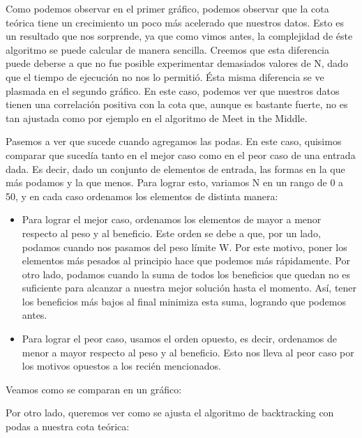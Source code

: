 Como podemos observar en el primer gráfico, podemos observar que la cota teórica tiene un crecimiento un poco más acelerado que nuestros datos. Esto es un resultado que nos sorprende, ya que como vimos antes, la complejidad de éste algoritmo se puede calcular de manera sencilla. Creemos que esta diferencia puede deberse a que no fue posible experimentar demasiados valores de N, dado que el tiempo de ejecución no nos lo permitió.
\newline
Ésta misma diferencia se ve plasmada en el segundo gráfico. En este caso, podemos ver que nuestros datos tienen una correlación positiva con la cota que, aunque es bastante fuerte, no es tan ajustada como por ejemplo en el algoritmo de Meet in the Middle.

\bigskip

Pasemos a ver que sucede cuando agregamos las podas. En este caso, quisimos comparar que sucedía tanto en el mejor caso como en el peor caso de una entrada dada. Es decir, dado un conjunto de elementos de entrada, las formas en la que más podamos y la que menos. Para lograr esto, variamos N en un rango de 0 a 50, y en cada caso ordenamos los elementos de distinta manera:
\begin{itemize}
\item Para lograr el mejor caso, ordenamos los elementos de mayor a menor respecto al peso y al beneficio. Este orden se debe a que, por un lado, podamos cuando nos pasamos del peso límite W. Por este motivo, poner los elementos más pesados al principio hace que podemos más rápidamente. Por otro lado, podamos cuando la suma de todos los beneficios que quedan no es suficiente para alcanzar a nuestra mejor solución hasta el momento. Así, tener los beneficios más bajos al final minimiza esta suma, logrando que podemos antes.
\item Para lograr el peor caso, usamos el orden opuesto, es decir, ordenamos de menor a mayor respecto al peso y al beneficio. Esto nos lleva al peor caso por los motivos opuestos a los recién mencionados.
\end{itemize}

Veamos como se comparan en un gráfico:


Por otro lado, queremos ver como se ajusta el algoritmo de backtracking con podas a nuestra cota teórica:

